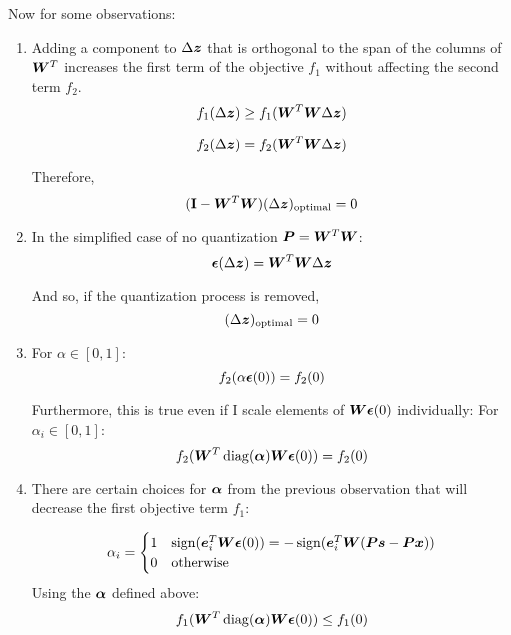 \documentclass{article}
\begin{document}
Now for some observations:
\begin{enumerate}
\item
Adding a component to $\Delta\bm{z}$ that is orthogonal to the span of the columns of $\bm{W}^T$ increases the first term of the objective $f_1$ without affecting the second term $f_2$.
\begin{equation}
f_1(\Delta\bm{z}) \geq f_1(\bm{W}^T\bm{W}\Delta\bm{z})
\end{equation}

\begin{equation}
f_2(\Delta\bm{z}) = f_2(\bm{W}^T\bm{W}\Delta\bm{z})
\end{equation}

Therefore,
\begin{equation}
({\bf I} - \bm{W}^T\bm{W})(\Delta\bm{z})_{\text{optimal}} = 0
\end{equation}

\item
In the simplified case of no quantization $\bm{P} = \bm{W}^T\bm{W}$:
\begin{equation}
\bm{\epsilon}(\Delta\bm{z}) = \bm{W}^T\bm{W}\Delta\bm{z}
\end{equation}

And so, if the quantization process is removed,
\begin{equation}
(\Delta\bm{z})_{\text{optimal}} = 0
\end{equation}

\item
For $\alpha \in [0,1]$:
\begin{equation}
f_2(\alpha\bm{\epsilon}(0)) = f_2(0)
\end{equation}

Furthermore, this is true even if I scale elements of $\bm{W}\bm{\epsilon}(0)$ individually:
For $\alpha_i \in [0,1]$:
\begin{equation}
f_2(\bm{W}^T\operatorname{diag}(\bm{\alpha})\bm{W}\bm{\epsilon}(0)) = f_2(0)
\end{equation}

\item
There are certain choices for $\bm{\alpha}$ from the previous observation that will decrease the first objective term $f_1$:

\begin{equation}
\alpha_i = \begin{cases} 1 & \operatorname{sign}(\bm{e}_i^T\bm{W}\bm{\epsilon}(0)) = -\operatorname{sign}(\bm{e}_i^T\bm{W}(\bm{P}\bm{s} - \bm{P}\bm{x})) \\
                         0 & \text{otherwise}
           \end{cases}
\end{equation}
Using the $\bm{\alpha}$ defined above:
\begin{equation}
f_1(\bm{W}^T\operatorname{diag}(\bm{\alpha})\bm{W}\bm{\epsilon}(0)) \leq f_1(0)
\end{equation}


\end{enumerate}
\end{document}
